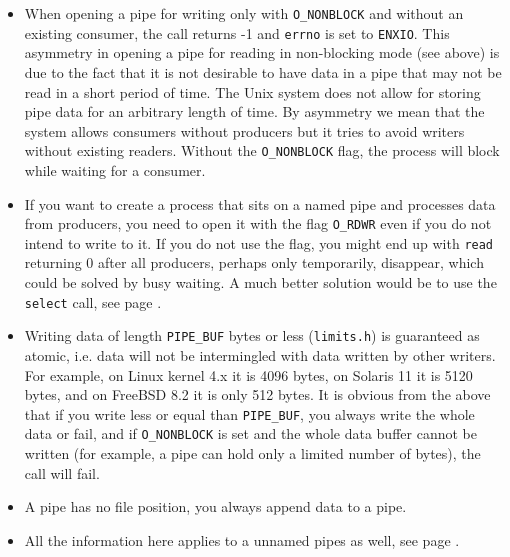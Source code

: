 \begin{itemize}
\item When opening a pipe for writing only with \texttt{O\_NONBLOCK} and without
an existing consumer, the call returns -1 and \texttt{errno} is set to
\texttt{ENXIO}.  This asymmetry in opening a pipe for reading in non-blocking
mode (see above) is due to the fact that it is not desirable to have data in a
pipe that may not be read in a short period of time.  The Unix system does not
allow for storing pipe data for an arbitrary length of time.  By asymmetry we
mean that the system allows consumers without producers but it tries to avoid
writers without existing readers.  Without the \texttt{O\_NONBLOCK} flag, the
process will block while waiting for a consumer.
\item  If you want to create a process that sits on a named pipe and processes
data from producers, you need to open it with the flag \texttt{O\_RDWR} even
if you do not intend to write to it.  If you do not use the flag, you might end
up with \texttt{read} returning 0 after all producers, perhaps only temporarily,
disappear, which could be solved by busy waiting.  A much better solution would
be to use the \texttt{select} call, see page \pageref{SELECT}.
\item Writing data of length \texttt{PIPE\_BUF} bytes or less
(\texttt{limits.h}) is guaranteed as atomic, i.e. data will not be intermingled
with data written by other writers.  For example, on Linux kernel 4.x it is 4096
bytes, on Solaris 11 it is 5120 bytes, and on FreeBSD 8.2 it is only 512 bytes.
It is obvious from the above that if you write less or equal than
\texttt{PIPE\_BUF}, you always write the whole data or fail, and if
\texttt{O\_NONBLOCK} is set and the whole data buffer cannot be written (for
example, a pipe can hold only a limited number of bytes), the call will fail.
\item A pipe has no file position, you always append data to a pipe.
\item All the information here applies to a unnamed pipes as well, see page
\pageref{PIPE}.


\end{itemize}
